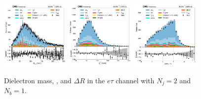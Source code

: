 \begin{figure}[htb!]
    \centering
    \includegraphics[width=0.3\textwidth]{chapters/Analysis/sectionPlots/figures/data_mc_overlays/etau_2016_cat_eq2_eq1_signal_linear_lepton_dilepton1_mass}
    \includegraphics[width=0.3\textwidth]{chapters/Analysis/sectionPlots/figures/data_mc_overlays/etau_2016_cat_eq2_eq1_signal_linear_lepton_dilepton1_pt}
    \includegraphics[width=0.3\textwidth]{chapters/Analysis/sectionPlots/figures/data_mc_overlays/etau_2016_cat_eq2_eq1_signal_linear_lepton_dilepton1_delta_r}
    \caption{Dielectron mass, \pt, and $\Delta R$ in the $e\tau$ channel
    with $N_{j} = 2$ and $N_{b} = 1$.}
    \label{fig:analysis:plots:etau_5_dilepton}
\end{figure}

